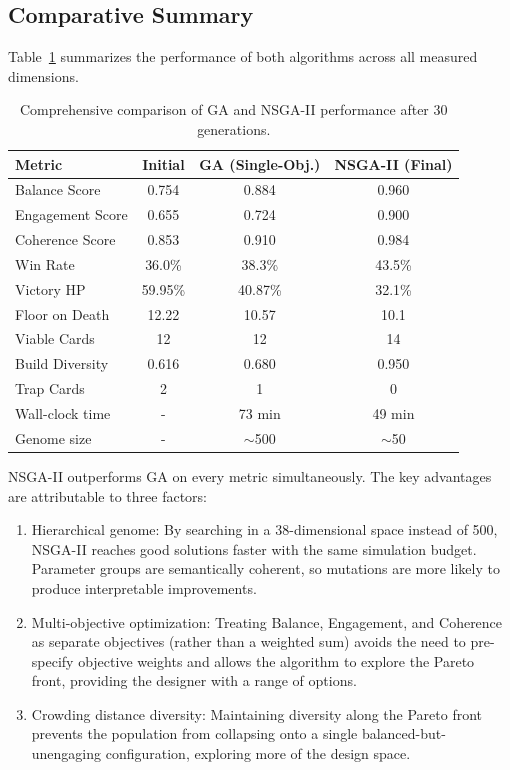 \subsection{Comparative Summary}

Table~\ref{tab:comparison} summarizes the performance of both algorithms across all measured dimensions.

\begin{table}[htbp]
    \centering
    \caption{Comprehensive comparison of GA and NSGA-II performance after 30 generations.}
    \label{tab:comparison}
    \begin{tabular}{lccc}
        \toprule
        Metric & Initial & GA (Single-Obj.) & NSGA-II (Final) \\
        \midrule
        Balance Score   & 0.754 & 0.884 & 0.960 \\
        Engagement Score & 0.655 & 0.724 & 0.900 \\
        Coherence Score & 0.853 & 0.910 & 0.984 \\
        Win Rate        & 36.0\% & 38.3\% & 43.5\% \\
        Victory HP      & 59.95\% & 40.87\% & 32.1\% \\
        Floor on Death  & 12.22 & 10.57 & 10.1 \\
        Viable Cards    & 12 & 12 & 14 \\
        Build Diversity & 0.616 & 0.680 & 0.950 \\
        Trap Cards      & 2 & 1 & 0 \\
        Wall-clock time & - & 73 min & 49 min \\
        Genome size     & - & $\sim$500 & $\sim$50 \\
        \bottomrule
    \end{tabular}
\end{table}

NSGA-II outperforms GA on every metric simultaneously. The key advantages are attributable to three factors:
\begin{enumerate}
    \item Hierarchical genome: By searching in a 38-dimensional space instead of 500, NSGA-II reaches good solutions faster with the same simulation budget. Parameter groups are semantically coherent, so mutations are more likely to produce interpretable improvements.
    \item Multi-objective optimization: Treating Balance, Engagement, and Coherence as separate objectives (rather than a weighted sum) avoids the need to pre-specify objective weights and allows the algorithm to explore the Pareto front, providing the designer with a range of options.
    \item Crowding distance diversity: Maintaining diversity along the Pareto front prevents the population from collapsing onto a single balanced-but-unengaging configuration, exploring more of the design space.
\end{enumerate}

